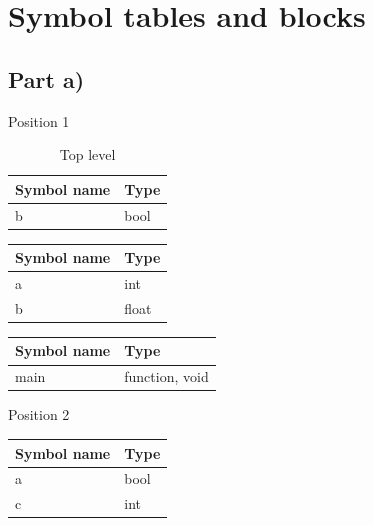 \documentclass[paper=a4, fontsize=11pt]{scrartcl} %
\numberwithin{equation}{section} %
\numberwithin{figure}{section} %
\numberwithin{table}{section} %
\begin{document}
\newpage
\section{Symbol tables and blocks}

\subsection{Part a)}

Position 1

\begin{table}[ht!]
    \center
    \begin{tabular}{|l|l|}
    \hline
    Symbol name & Type           \\ \hline
    b        & bool \\ \hline
    \end{tabular}
    \caption{Top level}
\end{table}

\begin{table}[ht!]
    \begin{center}
    \begin{tabular}{|l|l|}
    \hline
    Symbol name & Type           \\ \hline
    a        & int   \\ \hline
    b        & float \\ \hline
    \end{tabular}
    \end{center}
\end{table}

\begin{table}[ht!]
    \center
    \begin{tabular}{|l|l|}
    \hline
    Symbol name & Type           \\ \hline
    main        & function, void \\ \hline
    \end{tabular}
\end{table}

Position 2

\begin{table}[ht!]
    \center
    \begin{tabular}{|l|l|}
    \hline
    Symbol name & Type           \\ \hline
    a        & bool \\ \hline
    c        & int \\ \hline
    \end{tabular}
\end{table}
\end{document}
